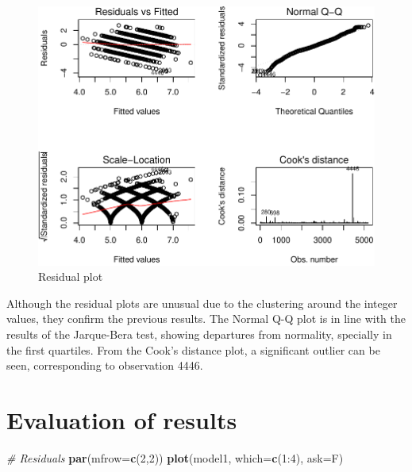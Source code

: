 \documentclass[12pt,]{article}
\newenvironment{Shaded}{\begin{snugshade}}{\end{snugshade}}
\newcommand{\KeywordTok}[1]{\textcolor[rgb]{0.13,0.29,0.53}{\textbf{{#1}}}}
\newcommand{\DataTypeTok}[1]{\textcolor[rgb]{0.13,0.29,0.53}{{#1}}}
\newcommand{\DecValTok}[1]{\textcolor[rgb]{0.00,0.00,0.81}{{#1}}}
\newcommand{\CommentTok}[1]{\textcolor[rgb]{0.56,0.35,0.01}{\textit{{#1}}}}
\newcommand{\NormalTok}[1]{{#1}}
\begin{document}
\begin{figure}

{\centering \includegraphics{quality-regression_files/figure-latex/residualplot-1} 

}

\caption{Residual plot}\label{fig:residualplot}
\end{figure}

Although the residual plots are unusual due to the clustering around the
integer values, they confirm the previous results. The Normal Q-Q plot
is in line with the results of the Jarque-Bera test, showing departures
from normality, specially in the first quartiles. From the Cook's
distance plot, a significant outlier can be seen, corresponding to
observation 4446.

\section{Evaluation of results}\label{evaluation-of-results}

\begin{Shaded}
\begin{Highlighting}[]
\CommentTok{# Residuals}
\KeywordTok{par}\NormalTok{(}\DataTypeTok{mfrow=}\KeywordTok{c}\NormalTok{(}\DecValTok{2}\NormalTok{,}\DecValTok{2}\NormalTok{))}
\KeywordTok{plot}\NormalTok{(model1, }\DataTypeTok{which=}\KeywordTok{c}\NormalTok{(}\DecValTok{1}\NormalTok{:}\DecValTok{4}\NormalTok{), }\DataTypeTok{ask=}\NormalTok{F)}
\end{Highlighting}
\end{Shaded}
\end{document}
